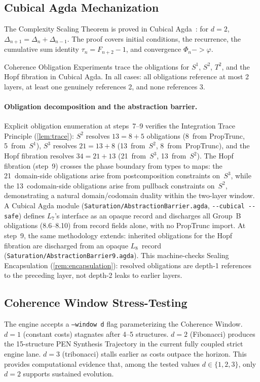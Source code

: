 \documentclass[11pt,a4paper]{article}
\def\to{->}%
\theoremstyle{plain}
\theoremstyle{definition}
\theoremstyle{remark}
\begin{document}
\subsection{Cubical Agda Mechanization}

The Complexity Scaling Theorem is proved in Cubical Agda~\cite{cubical-agda}:
for $d = 2$, $\Delta_{n+1} = \Delta_n + \Delta_{n-1}$.
The proof covers initial conditions, the recurrence, the cumulative sum identity $\tau_n = F_{n+2} - 1$, and convergence $\Phi_n \to \varphi$.

Coherence Obligation Experiments trace the obligations for $S^1$, $S^2$, $T^2$, and the Hopf fibration in Cubical Agda.
In all cases: all obligations reference at most 2 layers, at least one genuinely references 2, and none references 3.

\paragraph{Obligation decomposition and the abstraction barrier.}
Explicit obligation enumeration at steps~7--9 verifies the Integration Trace Principle (\cref{lem:trace}):
$S^2$ resolves $13 = 8 + 5$ obligations (8~from PropTrunc, 5~from~$S^1$), $S^3$ resolves $21 = 13 + 8$ (13~from~$S^2$, 8~from~PropTrunc), and the Hopf fibration resolves $34 = 21 + 13$ (21~from~$S^3$, 13~from~$S^2$).
The Hopf fibration (step~9) crosses the phase boundary from types to maps: the 21~domain-side obligations arise from postcomposition constraints on~$S^3$, while the 13~codomain-side obligations arise from pullback constraints on~$S^2$, demonstrating a natural domain/codomain duality within the two-layer window.
A Cubical Agda module (\texttt{Saturation/AbstractionBarrier.agda}, \texttt{-{}-cubical -{}-safe}) defines $L_7$'s interface as an opaque record and discharges all Group~B obligations (8.6--8.10) from record fields alone, with no PropTrunc import.
At step~9, the same methodology extends: inherited obligations for the Hopf fibration are discharged from an opaque $L_8$~record (\texttt{Saturation/AbstractionBarrier9.agda}).
This machine-checks Sealing Encapsulation (\cref{rem:encapsulation}): resolved obligations are depth-1 references to the preceding layer, not depth-2 leaks to earlier layers.

\subsection{Coherence Window Stress-Testing}

The engine accepts a \texttt{--window d} flag parameterizing the Coherence Window.
$d = 1$ (constant costs) stagnates after 4--5 structures.
$d = 2$ (Fibonacci) produces the 15-structure PEN Synthesis Trajectory in the current fully coupled strict engine lane.
$d = 3$ (tribonacci) stalls earlier as costs outpace the horizon.
This provides computational evidence that, among the tested values $d \in \{1, 2, 3\}$, only $d = 2$ supports sustained evolution.
\end{document}
